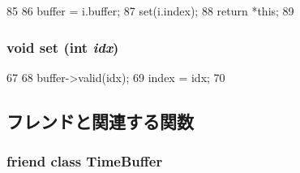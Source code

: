 \begin{DoxyCode}
85         {
86             buffer = i.buffer;
87             set(i.index);
88             return *this;
89         }
\end{DoxyCode}
\hypertarget{classTimeBuffer_1_1wire_afe5f3285602c2361c6b8362f44328d19}{
\subsubsection[{set}]{\setlength{\rightskip}{0pt plus 5cm}void set (int {\em idx})}}
\label{classTimeBuffer_1_1wire_afe5f3285602c2361c6b8362f44328d19}



\begin{DoxyCode}
67         {
68             buffer->valid(idx);
69             index = idx;
70         }
\end{DoxyCode}


\subsection{フレンドと関連する関数}
\hypertarget{classTimeBuffer_1_1wire_ab310b460b3d600c3c1251fb672966fe6}{
\subsubsection[{TimeBuffer}]{\setlength{\rightskip}{0pt plus 5cm}friend class {\bf TimeBuffer}}}
\label{classTimeBuffer_1_1wire_ab310b460b3d600c3c1251fb672966fe6}


